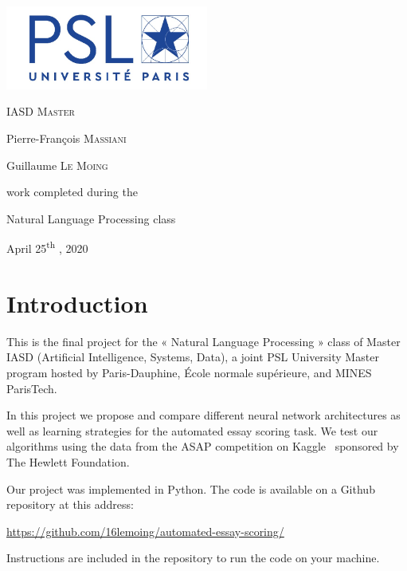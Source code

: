 \documentclass[a4paper,12pt,english]{article}
\begin{document}
\begin{titlepage}
	\centering
	\fbox{\begin{minipage}{\textwidth}
	\centering
	\vspace{0.3cm}
    {\scshape\LARGE\bfseries Project Report\par}
	\vspace{0.2cm}
	{\Large\bfseries Automated Essay Scoring \par}
	\vspace{0.3cm}
    \end{minipage}}
	
	\vfill
	\includegraphics[width=0.5\textwidth]{fig/psl.jpg}\par\vspace{0cm}
	{\scshape\Large IASD Master \par}
	\vfill
	{\Large Pierre-François \textsc{Massiani}\par}
	{\Large Guillaume \textsc{Le Moing}\par}
	\vfill
	work completed during the\par
	Natural Language Processing class
	\vfill
    {\large April 25\textsuperscript{th}  , 2020\par}
\end{titlepage}
\tableofcontents
\newpage

\section{Introduction}

This is the final project for the « Natural Language Processing » class of Master IASD (Artificial Intelligence, Systems, Data), a joint PSL University Master program hosted by Paris-Dauphine, École normale supérieure, and MINES ParisTech.

In this project we propose and compare different neural network architectures as well as learning strategies for the automated essay scoring task.
We test our algorithms using the data from the ASAP competition on Kaggle~\cite{kaggle} sponsored by The Hewlett Foundation.

Our project was implemented in Python. The code is available on a Github repository at this address:
\begin{center}
	\url{https://github.com/16lemoing/automated-essay-scoring/} 
\end{center}
Instructions are included in the repository to run the code on your machine.
\end{document}

